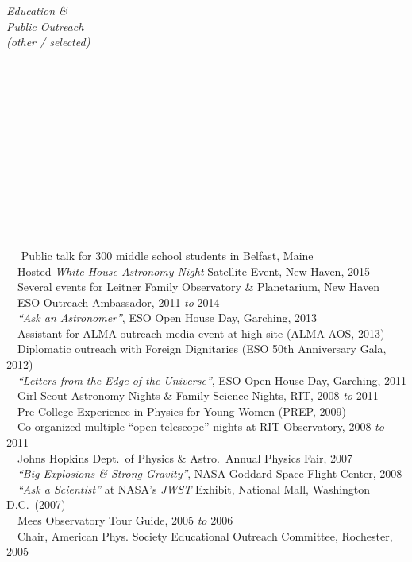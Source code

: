 \documentclass[11pt]{article}
\begin{document}
\vspace{4mm}




\hspace{2.5mm} \parbox{1.5in}{\textit{Education \& \\ Public Outreach \\ (other / selected) \\\\\\\\\\\\\\\\\\\\\\\\\\}} \parbox{5.15in}{
\textbullet~~ Public talk for 300 middle school students in Belfast, Maine\\
\textbullet~~Hosted \textit{White House Astronomy Night} Satellite Event, New Haven, 2015
\\
\textbullet~~Several events for Leitner Family Observatory \& Planetarium, New Haven
\\
\textbullet~~ESO Outreach Ambassador, 2011 \textit{to} 2014
\\\textbullet~~\textit{``Ask an Astronomer''}, ESO Open House Day, Garching, 2013
\\\textbullet~~Assistant for ALMA outreach media event at high site (ALMA AOS, 2013)
\\\textbullet~~Diplomatic outreach with Foreign Dignitaries (ESO 50th Anniversary Gala, 2012)
\\ \textbullet~~\textit{``Letters from the Edge of the Universe''}, ESO Open House Day, Garching, 2011
\\ \textbullet~~Girl Scout Astronomy Nights \& Family Science Nights, RIT, 2008 \textit{to} 2011
\\ \textbullet~~Pre-College Experience in Physics for Young Women (PREP, 2009)
\\ \textbullet~~Co-organized multiple ``open telescope'' nights at RIT Observatory, 2008 \textit{to} 2011
\\ \textbullet~~Johns Hopkins Dept.~of Physics \& Astro.~Annual Physics Fair, 2007
\\ \textbullet~~\textit{``Big Explosions \& Strong Gravity''}, NASA Goddard Space Flight Center, 2008
\\ \textbullet~~\textit{``Ask a Scientist''} at NASA's \textit{JWST} Exhibit, National Mall, Washington D.C.~(2007)
\\ \textbullet~~Mees Observatory Tour Guide, 2005 \textit{to} 2006
\\ \textbullet~~Chair, American Phys. Society Educational Outreach Committee, Rochester, 2005
}
\end{document}
